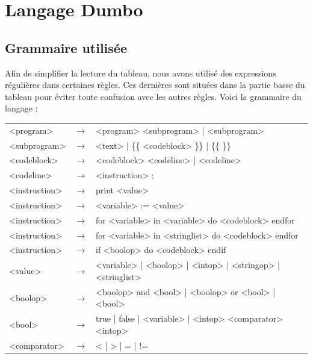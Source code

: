 \documentclass[10pt,a4paper]{article}
\begin{document}
	\newpage
	\section{Langage Dumbo}
	
	\subsection{Grammaire utilisée}
	Afin de simplifier la lecture du tableau, nous avons utilisé des expressions régulières dans certaines règles.
	Ces dernières sont situées dans la partie basse du tableau pour éviter toute confusion avec les autres règles.
	Voici la grammaire du langage :\\
	\begin{tabular}{|l l l|}
		\hline
		
		<program> & $\longrightarrow$ & <program> <subprogram> | <subprogram>\\
		<subprogram> & $\longrightarrow$ & <text> | \{\{ <codeblock> \}\} | \{\{ \}\} \\
		<codeblock> & $\longrightarrow$ & <codeblock> <codeline> | <codeline>\\
		<codeline> & $\longrightarrow$ & <instruction> ;\\
		<instruction> & $\longrightarrow$ & print <value>\\
		<instruction> & $\longrightarrow$ & <variable> := <value>\\
		<instruction> & $\longrightarrow$ & for <variable> in <variable> do <codeblock> endfor\\
		<instruction> & $\longrightarrow$ & for <variable> in <stringlist> do <codeblock> endfor\\
		<instruction> & $\longrightarrow$ & if <boolop> do <codeblock> endif\\
		
		<value> & $\longrightarrow$ & <variable> | <boolop> | <intop> | <stringop> | <stringlist>\\
		
		<boolop> & $\longrightarrow$ & <boolop> and <bool> | <boolop> or <bool> | <bool>\\
		<bool> & $\longrightarrow$ & true | false | <variable> | <intop> <comparator> <intop>\\
		<comparator> & $\longrightarrow$ & < | > | = | !=\\
		

\end{tabular}
\end{document}

